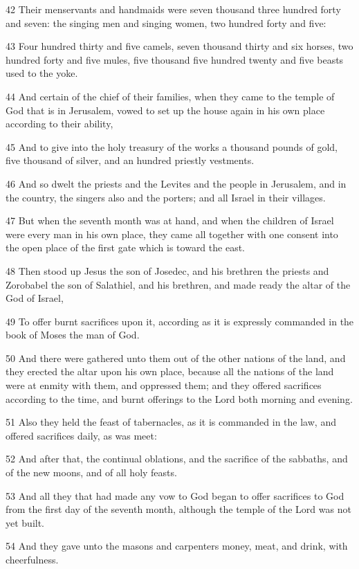 \par 42 Their menservants and handmaids were seven thousand three hundred forty and seven: the singing men and singing women, two hundred forty and five:
\par 43 Four hundred thirty and five camels, seven thousand thirty and six horses, two hundred forty and five mules, five thousand five hundred twenty and five beasts used to the yoke.
\par 44 And certain of the chief of their families, when they came to the temple of God that is in Jerusalem, vowed to set up the house again in his own place according to their ability,
\par 45 And to give into the holy treasury of the works a thousand pounds of gold, five thousand of silver, and an hundred priestly vestments.
\par 46 And so dwelt the priests and the Levites and the people in Jerusalem, and in the country, the singers also and the porters; and all Israel in their villages.
\par 47 But when the seventh month was at hand, and when the children of Israel were every man in his own place, they came all together with one consent into the open place of the first gate which is toward the east.
\par 48 Then stood up Jesus the son of Josedec, and his brethren the priests and Zorobabel the son of Salathiel, and his brethren, and made ready the altar of the God of Israel,
\par 49 To offer burnt sacrifices upon it, according as it is expressly commanded in the book of Moses the man of God.
\par 50 And there were gathered unto them out of the other nations of the land, and they erected the altar upon his own place, because all the nations of the land were at enmity with them, and oppressed them; and they offered sacrifices according to the time, and burnt offerings to the Lord both morning and evening.
\par 51 Also they held the feast of tabernacles, as it is commanded in the law, and offered sacrifices daily, as was meet:
\par 52 And after that, the continual oblations, and the sacrifice of the sabbaths, and of the new moons, and of all holy feasts.
\par 53 And all they that had made any vow to God began to offer sacrifices to God from the first day of the seventh month, although the temple of the Lord was not yet built.
\par 54 And they gave unto the masons and carpenters money, meat, and drink, with cheerfulness.
